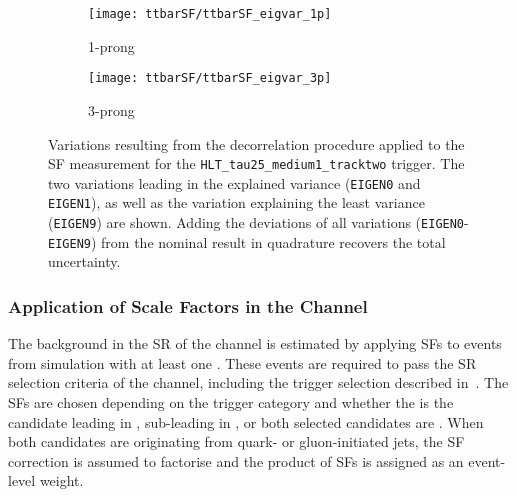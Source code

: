 \begin{figure}[htbp]
  \centering

  \begin{subfigure}[t]{.495\textwidth}
    \texttt{[image: ttbarSF/ttbarSF\_eigvar\_1p]}
    \caption{1-prong \tauhadvis}
    \label{fig:ttbarSF_eigenvariations_1p}
  \end{subfigure}\hfill%
  \begin{subfigure}[t]{.495\textwidth}
    \texttt{[image: ttbarSF/ttbarSF\_eigvar\_3p]}
    \caption{3-prong \tauhadvis}
    \label{fig:ttbarSF_eigenvariations_3p}
  \end{subfigure}

  \caption{Variations resulting from the decorrelation procedure applied to the
    SF measurement for the \texttt{HLT\_tau25\_medium1\_tracktwo} trigger. The
    two variations leading in the explained variance (\texttt{EIGEN0} and
    \texttt{EIGEN1}), as well as the variation explaining the least variance
    (\texttt{EIGEN9}) are shown. Adding the deviations of all variations
    (\texttt{EIGEN0}-\texttt{EIGEN9}) from the nominal result in quadrature
    recovers the total uncertainty.}%
  \label{fig:ttbarSF_eigenvariations}
\end{figure}


\subsubsection{Application of \Faketauhadvis Scale Factors in the \hadhad
  Channel}

The \ttbarFakes background in the SR of the \hadhad channel is estimated by
applying \faketauhadvis SFs to \ttbar events from simulation with at least one
\faketauhadvis. These events are required to pass the SR selection criteria of
the \hadhad channel, including the trigger selection described
in~. The SFs are chosen depending on the trigger category and
whether the \faketauhadvis is the \tauhadvis candidate leading in \pT,
sub-leading in \pT, or both selected candidates are \faketauhadvis. When both
\tauhadvis candidates are originating from quark- or gluon-initiated jets, the
SF correction is assumed to factorise and the product of SFs is assigned as an
event-level weight.

